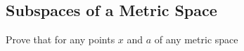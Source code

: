 \subsection{Subspaces of a Metric Space}


\begin{majorEx}
  Prove that for any points $x$ and $a$ of any metric space
\end{majorEx}